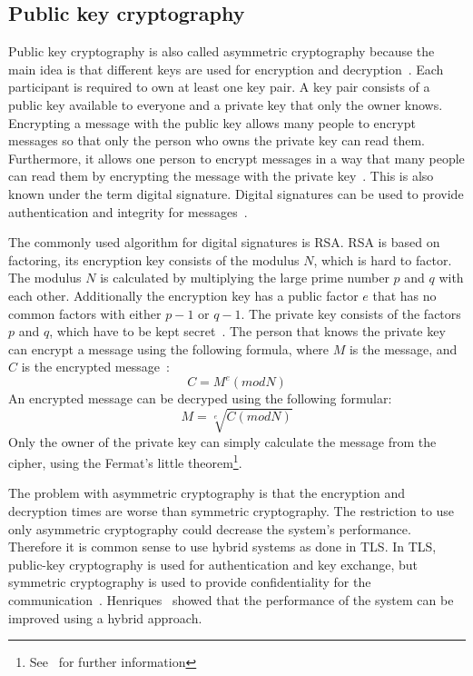 \subsection{Public key cryptography}
Public key cryptography is also called asymmetric cryptography because the main idea is that different keys are used for encryption and decryption~\cite{anderson2020security}.
Each participant is required to own at least one key pair.
A key pair consists of a public key available to everyone and a private key that only the owner knows.
Encrypting a message with the public key allows many people to encrypt messages so that only the person who owns the private key can read them.
Furthermore, it allows one person to encrypt messages in a way that many people can read them by encrypting the message with the private key~\cite{henriques2017using}.
This is also known under the term digital signature. 
Digital signatures can be used to provide authentication and integrity for messages~\cite{anderson2020security}.

The commonly used algorithm for digital signatures is RSA.
RSA is based on factoring, its encryption key consists of the modulus $N$, which is hard to factor.
The modulus $N$ is calculated by multiplying the large prime number $p$ and $q$ with each other.
Additionally the encryption key has a public factor $e$ that has no common factors with either $p-1$ or $q-1$.
The private key consists of the factors $p$ and $q$, which have to be kept secret~\cite{anderson2020security}.
The person that knows the private key can encrypt a message using the following formula, where $M$ is the message, and $C$ is the encrypted message~\cite{anderson2020security}:
\begin{displaymath}
	C = M^e (mod N)
\end{displaymath}
An encrypted message can be decryped using the following formular:
\begin{displaymath}
	M = \sqrt[e]{C (mod N)}
\end{displaymath}
Only the owner of the private key can simply calculate the message from the cipher, using the Fermat's little theorem\footnote{See~\cite{fermatlittle} for further information}.

The problem with asymmetric cryptography is that the encryption and decryption times are worse than symmetric cryptography.
The restriction to use only asymmetric cryptography could decrease the system's performance.
Therefore it is common sense to use hybrid systems as done in TLS.
In TLS, public-key cryptography is used for authentication and key exchange, but symmetric cryptography is used to provide confidentiality for the communication~\cite{henriques2017using}.
Henriques~\cite{henriques2017using} showed that the performance of the system can be improved using a hybrid approach.


